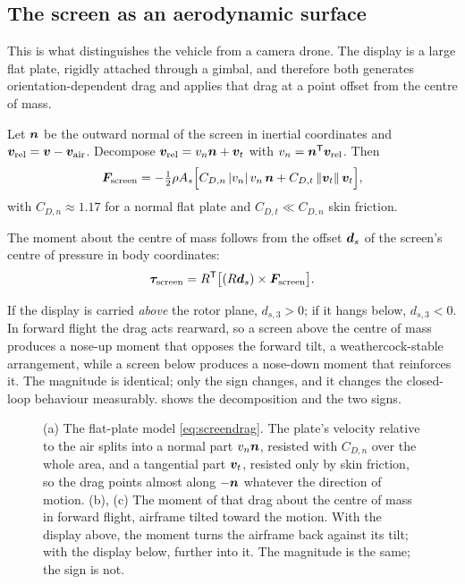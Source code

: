 \subsection{The screen as an aerodynamic surface}

This is what distinguishes the vehicle from a camera drone. The display is a
large flat plate, rigidly attached through a gimbal, and therefore both
generates orientation-dependent drag and applies that drag at a point offset
from the centre of mass.

\begin{model}
\label{mod:screen}
Let $\bm{n}$ be the outward normal of the screen in inertial coordinates and
$\bm{v}_{\mathrm{rel}} = \bm{v} - \bm{v}_{\mathrm{air}}$. Decompose
$\bm{v}_{\mathrm{rel}} = v_n\bm{n} + \bm{v}_t$ with
$v_n = \bm{n}^{\mathsf{T}}\bm{v}_{\mathrm{rel}}$. Then
\begin{equation}
  \bm{F}_{\mathrm{screen}}
  = -\tfrac12\rho A_s\Big[
      C_{D,n}\,|v_n|\,v_n\,\bm{n}
      + C_{D,t}\,\|\bm{v}_t\|\,\bm{v}_t \Big] ,
  \label{eq:screendrag}
\end{equation}
with $C_{D,n}\approx1.17$ for a normal flat plate and $C_{D,t}\ll C_{D,n}$
skin friction.
\end{model}

The moment about the centre of mass follows from the offset $\bm{d}_s$ of the
screen's centre of pressure in body coordinates:
\begin{equation}
  \bm{\tau}_{\mathrm{screen}} = R^{\mathsf{T}}\big[(R\bm{d}_s)\times
    \bm{F}_{\mathrm{screen}}\big] .
  \label{eq:screenmoment}
\end{equation}

\begin{remark}
If the display is carried \emph{above} the rotor plane, $d_{s,3}>0$; if it
hangs below, $d_{s,3}<0$. In forward flight the drag acts rearward, so a screen
above the centre of mass produces a nose-up moment that opposes the forward
tilt, a weathercock-stable arrangement, while a screen below produces a
nose-down moment that reinforces it. The magnitude is identical; only the sign
changes, and it changes the closed-loop behaviour measurably.
 shows the decomposition and the two signs.
\end{remark}

\begin{figure}[tbp]
\centering

\caption{(a) The flat-plate model \cref{eq:screendrag}. The plate's velocity
relative to the air splits into a normal part $v_n\bm{n}$, resisted with
$C_{D,n}$ over the whole area, and a tangential part $\bm{v}_t$, resisted only
by skin friction, so the drag points almost along $-\bm{n}$ whatever the
direction of motion. (b), (c) The moment of that drag about the centre of mass
in forward flight, airframe tilted toward the motion. With the display above,
the moment turns the airframe back against its tilt; with the display below,
further into it. The magnitude is the same; the sign is not.}
\label{fig:plate}
\end{figure}

